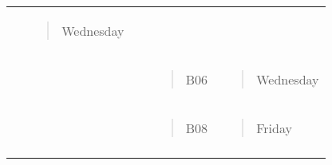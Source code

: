 \begin{longtable}[]{@{}lllll@{}}
\begin{minipage}[t]{0.19\columnwidth}
\end{minipage} & \begin{minipage}[t]{0.19\columnwidth}\raggedright\strut
\begin{quote}
Wednesday
\end{quote}\strut
\end{minipage}\tabularnewline
\begin{minipage}[t]{0.19\columnwidth}\raggedright\strut
\strut
\end{minipage} & \begin{minipage}[t]{0.19\columnwidth}\raggedright\strut
\strut
\end{minipage} & \begin{minipage}[t]{0.19\columnwidth}\raggedright\strut
\strut
\end{minipage} & \begin{minipage}[t]{0.19\columnwidth}\raggedright\strut
\begin{quote}
B06
\end{quote}\strut
\end{minipage} & \begin{minipage}[t]{0.19\columnwidth}\raggedright\strut
\begin{quote}
Wednesday
\end{quote}\strut
\end{minipage}\tabularnewline
\begin{minipage}[t]{0.19\columnwidth}\raggedright\strut
\strut
\end{minipage} & \begin{minipage}[t]{0.19\columnwidth}\raggedright\strut
\strut
\end{minipage} & \begin{minipage}[t]{0.19\columnwidth}\raggedright\strut
\strut
\end{minipage} & \begin{minipage}[t]{0.19\columnwidth}\raggedright\strut
\begin{quote}
B08
\end{quote}\strut
\end{minipage} & \begin{minipage}[t]{0.19\columnwidth}\raggedright\strut
\begin{quote}
Friday
\end{quote}\strut
\end{minipage}\tabularnewline
\begin{minipage}[t]{0.19\columnwidth}\raggedright\strut
\strut
\end{minipage} & \begin{minipage}[t]{0.19\columnwidth}\raggedright\strut

\end{minipage}
\end{longtable}
